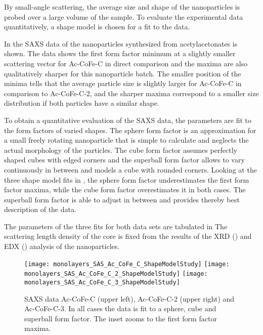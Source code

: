 \documentclass[\main/dresen_thesis.tex]{subfiles}
\begin{document}
  \label{sec:monolayers:nanoparticle:sas}

  By small-angle scattering, the average size and shape of the nanoparticles is probed over a large volume of the sample.
  To evaluate the experimental data quantitatively, a shape model is chosen for a fit to the data.

    In  the SAXS data of the nanoparticles synthesized from acetylacetonates is shown.
    The data shows the first form factor minimum at a slightly smaller scattering vector for Ac-CoFe-C in direct comparison and the maxima are also qualitatively sharper for this nanoparticle batch.
    The smaller position of the minima tells that the average particle size is slightly larger for Ac-CoFe-C in comparison to Ac-CoFe-C-2, and the sharper maxima correspond to a smaller size distribution if both particles have a similar shape.

    To obtain a quantitative evaluation of the SAXS data, the parameters are fit to the form factors of varied shapes.
    The sphere form factor is an approximation for a small freely rotating nanoparticle that is simple to calculate and neglects the actual morphology of the particles.
    The cube form factor assumes perfectly shaped cubes with edged corners and the superball form factor allows to vary continuously in between and models a cube with rounded corners.
    Looking at the three shape model fits in , the sphere form factor underestimates the first form factor maxima, while the cube form factor overestimates it in both cases.
    The superball form factor is able to adjust in between and provides thereby best description of the data.

    The parameters of the three fits for both data sets are tabulated in 
    The scattering length density of the core is fixed from the results of the XRD () and EDX () analysis of the nanoparticles.


    \begin{figure}[!htbp]
      \centering
      \texttt{[image: monolayers\_SAS\_Ac\_CoFe\_C\_ShapeModelStudy]}
      \texttt{[image: monolayers\_SAS\_Ac\_CoFe\_C\_2\_ShapeModelStudy]}
      \texttt{[image: monolayers\_SAS\_Ac\_CoFe\_C\_3\_ShapeModelStudy]}
      \caption{\label{fig:monolayers:nanoparticle:sas:AcAcCoFeC}SAXS data Ac-CoFe-C (upper left), Ac-CoFe-C-2 (upper right) and Ac-CoFe-C-3. In all cases the data is fit to a sphere, cube and superball form factor. The inset zooms to the first form factor maxima.}
    \end{figure}
\end{document}
